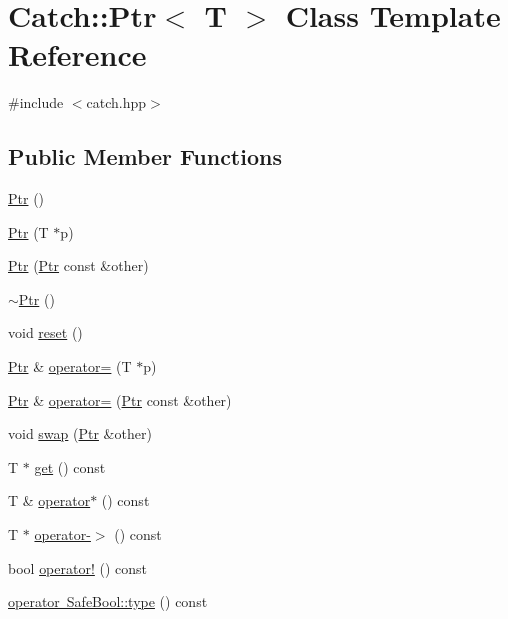 \hypertarget{class_catch_1_1_ptr}{}\section{Catch\+:\+:Ptr$<$ T $>$ Class Template Reference}
\label{class_catch_1_1_ptr}


{\ttfamily \#include $<$catch.\+hpp$>$}

\subsection*{Public Member Functions}
\begin{DoxyCompactItemize}
\item 
\mbox{\hyperlink{class_catch_1_1_ptr_a6108f0195595ee9d7a411daea810beaf}{Ptr}} ()
\item 
\mbox{\hyperlink{class_catch_1_1_ptr_aacec063a79cd142e39040a31c6b3c40b}{Ptr}} (T $\ast$p)
\item 
\mbox{\hyperlink{class_catch_1_1_ptr_ac629dd8ebe5763a37bb89e6c1d6a1771}{Ptr}} (\mbox{\hyperlink{class_catch_1_1_ptr}{Ptr}} const \&other)
\item 
\mbox{\hyperlink{class_catch_1_1_ptr_ac96d3bb33adcfb983207385cfba5fe8a}{$\sim$\+Ptr}} ()
\item 
void \mbox{\hyperlink{class_catch_1_1_ptr_af8d0fa7a2cd20842830b354ac31dfe5c}{reset}} ()
\item 
\mbox{\hyperlink{class_catch_1_1_ptr}{Ptr}} \& \mbox{\hyperlink{class_catch_1_1_ptr_a9b08c868b447d679ed201921f5c94683}{operator=}} (T $\ast$p)
\item 
\mbox{\hyperlink{class_catch_1_1_ptr}{Ptr}} \& \mbox{\hyperlink{class_catch_1_1_ptr_af42074444c1bc6a70ebdc406a8617708}{operator=}} (\mbox{\hyperlink{class_catch_1_1_ptr}{Ptr}} const \&other)
\item 
void \mbox{\hyperlink{class_catch_1_1_ptr_a172bf8b4e71e26a5a4d92f5b02158b50}{swap}} (\mbox{\hyperlink{class_catch_1_1_ptr}{Ptr}} \&other)
\item 
T $\ast$ \mbox{\hyperlink{class_catch_1_1_ptr_a2158bb2a1a21b001a2e72d4591d3e31e}{get}} () const
\item 
T \& \mbox{\hyperlink{class_catch_1_1_ptr_a8d73989b1c77a1cab6152766feaa837f}{operator$\ast$}} () const
\item 
T $\ast$ \mbox{\hyperlink{class_catch_1_1_ptr_acc0996cbd99f360069260a898b3f4fda}{operator-\/$>$}} () const
\item 
bool \mbox{\hyperlink{class_catch_1_1_ptr_a85c4fe6cebf2a69d0416020b65714360}{operator!}} () const
\item 
\mbox{\hyperlink{class_catch_1_1_ptr_a102838cb25643586679e12efca26a3af}{operator Safe\+Bool\+::type}} () const
\end{DoxyCompactItemize}


